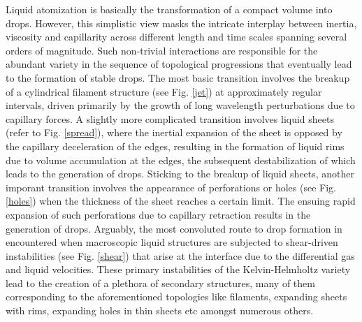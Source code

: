 Liquid atomization is basically the transformation of a compact volume into drops.
However, this simplistic view masks the intricate interplay between inertia, viscosity and capillarity across 
different length and time scales spanning several orders of magnitude.  
Such non-trivial interactions are responsible for the abundant variety in the sequence 
of topological progressions that eventually lead to the formation of stable drops. 
The most basic transition involves the breakup of a cylindrical filament structure 
(see Fig. \ref{jet}) at approximately regular intervals, driven primarily by the 
growth of long wavelength perturbations due to capillary forces. 
A slightly more complicated transition involves liquid sheets (refer to Fig. \ref{spread}), 
where the inertial expansion of the sheet is opposed by the capillary deceleration of the edges,
resulting in the formation of liquid rims due to volume accumulation at the edges, 
the subsequent destabilization of which leads to the generation of drops. 
Sticking to the breakup of liquid sheets, another imporant transition involves the  
appearance of perforations or holes (see Fig. \ref{holes}) when the thickness of the sheet reaches a certain limit. 
The ensuing rapid expansion of such perforations due to capillary retraction results in the generation of drops. 
Arguably, the most convoluted route to drop formation in encountered when macroscopic 
liquid structures are subjected to shear-driven instabilities (see Fig. \ref{shear}) that 
arise at the interface due to the differential gas and liquid velocities. 
These primary instabilities of the Kelvin-Helmholtz \cite{khi} variety lead to the creation 
of a plethora of secondary structures, many of them corresponding to the aforementioned 
topologies like filaments, expanding sheets with rims, expanding holes in thin sheets etc amongst numerous others. 


